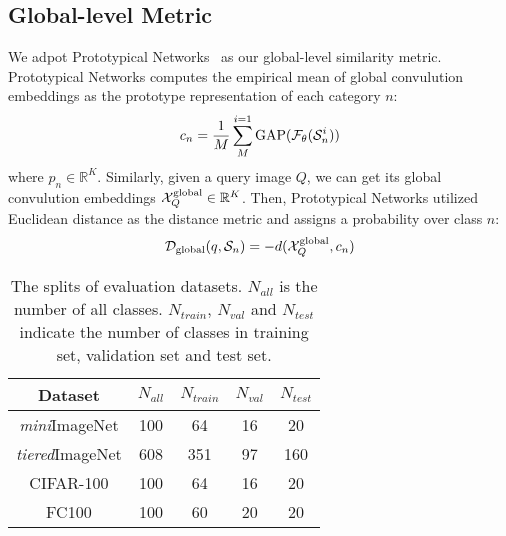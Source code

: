 \documentclass{article}
\begin{document}
\subsection{Global-level Metric}
We adpot Prototypical Networks~\cite{snell2017prototypical} as our global-level similarity metric. Prototypical Networks computes the empirical mean of global convulution embeddings as the prototype representation of each category $n$:
\begin{equation}
	c_n = \frac{1}{M} \sum_{M}^{i=1} {\rm GAP}(\mathcal{F}_{\theta}(\mathcal{S}_n^i))
\end{equation}
where $p_n\in\mathbb{R}^{K}$. Similarly, given a query image $Q$, we can get its global convulution embeddings $\mathcal{X}^{\rm global}_Q\in\mathbb{R}^{K}$.
Then, Prototypical Networks utilized Euclidean distance as the distance metric and assigns a probability over class $n$:
\begin{equation}
	\mathcal{D}_{\rm global}(q, \mathcal{S}_n)= -d(\mathcal{X}^{\rm global}_Q, c_n)
\end{equation}

\begin{table}[t]
	\centering
	\begin{tabular}{ccccc}
		\toprule
		\textbf{Dataset} &\textbf{$N_{all}$}&\textbf{$N_{train}$}&\textbf{$N_{val}$}&\textbf{$N_{test}$}
		\\
		\midrule
		\emph{mini}ImageNet&100&64&16&20\\
		\emph{tiered}ImageNet&608&351&97&160\\
		CIFAR-100&100&64&16&20\\		
		FC100&100&60&20&20\\
		\bottomrule
	\end{tabular}	
	\caption{The splits of evaluation datasets. $N_{all}$ is the number of all classes. $N_{train}$, $N_{val}$ and $N_{test}$ indicate the number of classes in training set, validation set and test set.}
\end{table}
\end{document}
